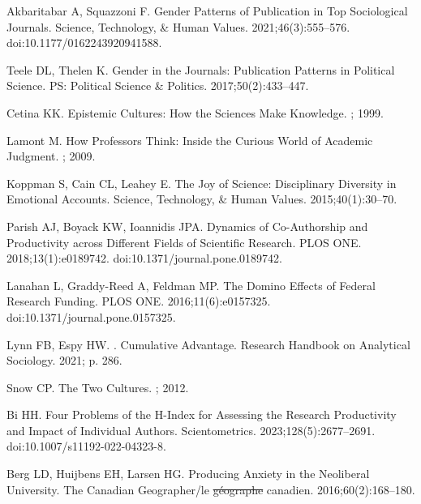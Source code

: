 \documentclass[
  10pt,
  letterpaper,
]{article}
\providecommand{\DIFaddtex}[1]{{\protect\color{blue}\uwave{#1}}} %
\providecommand{\DIFdeltex}[1]{{\protect\color{red}\sout{#1}}}                      %
\providecommand{\DIFaddbegin}{} %
\providecommand{\DIFaddend}{} %
\providecommand{\DIFdelbegin}{} %
\providecommand{\DIFdelend}{} %
\providecommand{\DIFadd}[1]{\texorpdfstring{\DIFaddtex{#1}}{#1}} %
\providecommand{\DIFdel}[1]{\texorpdfstring{\DIFdeltex{#1}}{}} %
\newcommand{\DIFscaledelfig}{0.5}
\newlength{\DIFdelgraphicswidth} %
\newlength{\DIFdelgraphicsheight} %
\newcommand{\DIFaddincludegraphics}[2][]{{\color{blue}\fbox{\DIFOincludegraphics[#1]{#2}}}} %
\newcommand{\DIFdelincludegraphics}[2][]{%
\sbox{\DIFdelgraphicsbox}{\DIFOincludegraphics[#1]{#2}}%
\settoboxwidth{\DIFdelgraphicswidth}{\DIFdelgraphicsbox} %
\settoboxtotalheight{\DIFdelgraphicsheight}{\DIFdelgraphicsbox} %
\scalebox{\DIFscaledelfig}{%
\parbox[b]{\DIFdelgraphicswidth}{\usebox{\DIFdelgraphicsbox}\\[-\baselineskip] \rule{\DIFdelgraphicswidth}{0em}}\llap{\resizebox{\DIFdelgraphicswidth}{\DIFdelgraphicsheight}{%
\setlength{\unitlength}{\DIFdelgraphicswidth}%
\begin{picture}(1,1)%
\thicklines\linethickness{2pt} %
{\color[rgb]{1,0,0}\put(0,0){\framebox(1,1){}}}%
{\color[rgb]{1,0,0}\put(0,0){\line( 1,1){1}}}%
{\color[rgb]{1,0,0}\put(0,1){\line(1,-1){1}}}%
\end{picture}%
}\hspace*{3pt}}} %
} %
\DeclareRobustCommand{\DIFaddbegin}{\DIFOaddbegin \let\includegraphics\DIFaddincludegraphics} %
\DeclareRobustCommand{\DIFaddend}{\DIFOaddend \let\includegraphics\DIFOincludegraphics} %
\DeclareRobustCommand{\DIFdelbegin}{\DIFOdelbegin \let\includegraphics\DIFdelincludegraphics} %
\DeclareRobustCommand{\DIFdelend}{\DIFOaddend \let\includegraphics\DIFOincludegraphics} %
\begin{document}
\begin{thebibliography}{10}
Akbaritabar A, Squazzoni F.
\newblock Gender {{Patterns}} of {{Publication}} in {{Top Sociological Journals}}.
\newblock Science, Technology, \& Human Values. 2021;46(3):555--576.
\newblock doi:{10.1177/0162243920941588}.

Teele DL, Thelen K.
\newblock Gender in the Journals: {{Publication}} Patterns in Political Science.
\newblock PS: Political Science \& Politics. 2017;50(2):433--447.

Cetina KK.
\newblock Epistemic {{Cultures}}: {{How}} the {{Sciences Make Knowledge}}.
; 1999.

Lamont M.
\newblock How {{Professors Think}}: {{Inside}} the {{Curious World}} of {{Academic Judgment}}.
; 2009.

Koppman S, Cain CL, Leahey E.
\newblock The Joy of Science: {{Disciplinary}} Diversity in Emotional Accounts.
\newblock Science, Technology, \& Human Values. 2015;40(1):30--70.

Parish AJ, Boyack KW, Ioannidis JPA.
\newblock Dynamics of Co-Authorship and Productivity across Different Fields of Scientific Research.
\newblock PLOS ONE. 2018;13(1):e0189742.
\newblock doi:{10.1371/journal.pone.0189742}.

Lanahan L, {Graddy-Reed} A, Feldman MP.
\newblock The {{Domino Effects}} of {{Federal Research Funding}}.
\newblock PLOS ONE. 2016;11(6):e0157325.
\newblock doi:{10.1371/journal.pone.0157325}.

Lynn FB, Espy HW.
. {{Cumulative}} Advantage.
\newblock Research Handbook on Analytical Sociology. 2021; p. 286.

Snow CP.
\newblock The Two Cultures.
; 2012.

Bi HH.
\newblock Four Problems of the H-Index for Assessing the Research Productivity and Impact of Individual Authors.
\newblock Scientometrics. 2023;128(5):2677--2691.
\newblock doi:{10.1007/s11192-022-04323-8}.

Berg LD, Huijbens EH, Larsen HG.
\newblock Producing Anxiety in the Neoliberal University.
\newblock The Canadian Geographer/le \DIFdelbegin \DIFdel{g\'eographe }\DIFdelend \DIFaddbegin \DIFadd{g}{\DIFadd{\'e}}\DIFadd{ographe }\DIFaddend canadien. 2016;60(2):168--180.


\end{thebibliography}
\end{document}
